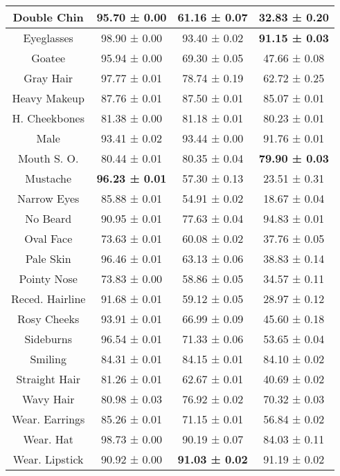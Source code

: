 \begin{table*}[h]
\begin{center}
\begin{small}
{\begin{tabular}{|c|c|c|c|}
Double Chin        & 95.70 ± 0.00 & 61.16 ± 0.07 & 32.83 ± 0.20 \\ \hline
Eyeglasses         & 98.90 ± 0.00 & 93.40 ± 0.02 & \textbf{91.15 ± 0.03} \\ \hline
Goatee             & 95.94 ± 0.00 & 69.30 ± 0.05 & 47.66 ± 0.08 \\ \hline
Gray Hair          & 97.77 ± 0.01 & 78.74 ± 0.19 & 62.72 ± 0.25 \\ \hline
Heavy Makeup       & 87.76 ± 0.01 & 87.50 ± 0.01 & 85.07 ± 0.01 \\ \hline
H. Cheekbones      & 81.38 ± 0.00 & 81.18 ± 0.01 & 80.23 ± 0.01 \\ \hline
Male               & 93.41 ± 0.02 & 93.44 ± 0.00 & 91.76 ± 0.01 \\ \hline
Mouth S. O.        & 80.44 ± 0.01 & 80.35 ± 0.04 & \textbf{79.90 ± 0.03} \\ \hline
Mustache           & \textbf{96.23 ± 0.01} & 57.30 ± 0.13 & 23.51 ± 0.31 \\ \hline
Narrow Eyes        & 85.88 ± 0.01 & 54.91 ± 0.02 & 18.67 ± 0.04 \\ \hline
No Beard           & 90.95 ± 0.01 & 77.63 ± 0.04 & 94.83 ± 0.01 \\ \hline
Oval Face          & 73.63 ± 0.01 & 60.08 ± 0.02 & 37.76 ± 0.05 \\ \hline
Pale Skin          & 96.46 ± 0.01 & 63.13 ± 0.06 & 38.83 ± 0.14 \\ \hline
Pointy Nose        & 73.83 ± 0.00 & 58.86 ± 0.05 & 34.57 ± 0.11 \\ \hline
Reced. Hairline    & 91.68 ± 0.01 & 59.12 ± 0.05 & 28.97 ± 0.12 \\ \hline
Rosy Cheeks        & 93.91 ± 0.01 & 66.99 ± 0.09 & 45.60 ± 0.18 \\ \hline
Sideburns          & 96.54 ± 0.01 & 71.33 ± 0.06 & 53.65 ± 0.04 \\ \hline
Smiling            & 84.31 ± 0.01 & 84.15 ± 0.01 & 84.10 ± 0.02 \\ \hline
Straight Hair      & 81.26 ± 0.01 & 62.67 ± 0.01 & 40.69 ± 0.02 \\ \hline
Wavy Hair          & 80.98 ± 0.03 & 76.92 ± 0.02 & 70.32 ± 0.03 \\ \hline
Wear. Earrings     & 85.26 ± 0.01 & 71.15 ± 0.01 & 56.84 ± 0.02 \\ \hline
Wear. Hat          & 98.73 ± 0.00 & 90.19 ± 0.07 & 84.03 ± 0.11 \\ \hline
Wear. Lipstick     & 90.92 ± 0.00 & \textbf{91.03 ± 0.02} & 91.19 ± 0.02 \\ \hline

\end{tabular}}
\end{small}
\end{center}
\end{table*}
